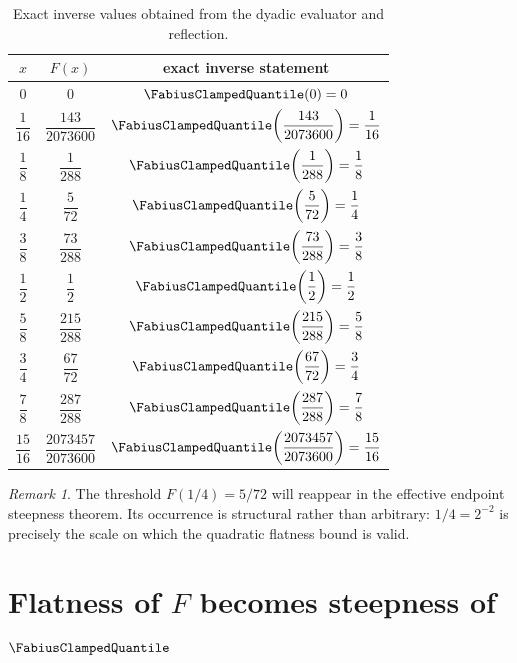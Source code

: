 \documentclass[11pt,oneside]{article}
\theoremstyle{definition}
\theoremstyle{remark}
\newtheorem{remark}[remark]{Remark}
\begin{document}
\begin{table}[ht]
\centering
\small
\begin{tabular}{@{}ccc@{}}
\toprule
$x$ & $F(x)$ & exact inverse statement\\
\midrule
$0$ & $0$ & $\FabiusClampedQuantile(0)=0$\\
$\dfrac1{16}$ & $\dfrac{143}{2073600}$
  & $\FabiusClampedQuantile\!\left(\dfrac{143}{2073600}\right)=\dfrac1{16}$\\[0.55em]
$\dfrac18$ & $\dfrac1{288}$
  & $\FabiusClampedQuantile\!\left(\dfrac1{288}\right)=\dfrac18$\\[0.55em]
$\dfrac14$ & $\dfrac5{72}$
  & $\FabiusClampedQuantile\!\left(\dfrac5{72}\right)=\dfrac14$\\[0.55em]
$\dfrac38$ & $\dfrac{73}{288}$
  & $\FabiusClampedQuantile\!\left(\dfrac{73}{288}\right)=\dfrac38$\\[0.55em]
$\dfrac12$ & $\dfrac12$
  & $\FabiusClampedQuantile\!\left(\dfrac12\right)=\dfrac12$\\[0.55em]
$\dfrac58$ & $\dfrac{215}{288}$
  & $\FabiusClampedQuantile\!\left(\dfrac{215}{288}\right)=\dfrac58$\\[0.55em]
$\dfrac34$ & $\dfrac{67}{72}$
  & $\FabiusClampedQuantile\!\left(\dfrac{67}{72}\right)=\dfrac34$\\[0.55em]
$\dfrac78$ & $\dfrac{287}{288}$
  & $\FabiusClampedQuantile\!\left(\dfrac{287}{288}\right)=\dfrac78$\\[0.55em]
$\dfrac{15}{16}$ & $\dfrac{2073457}{2073600}$
  & $\FabiusClampedQuantile\!\left(\dfrac{2073457}{2073600}\right)=\dfrac{15}{16}$\\
\bottomrule
\end{tabular}
\caption{Exact inverse values obtained from the dyadic evaluator and
reflection.}
\label{inverse:tab:inverse-dyadic}
\end{table}

\begin{remark}
The threshold $F(1/4)=5/72$ will reappear in the effective endpoint
steepness theorem.  Its occurrence is structural rather than arbitrary:
$1/4=2^{-2}$ is precisely the scale on which the quadratic flatness bound
is valid.
\end{remark}

\section{\texorpdfstring{Flatness of \(F\) becomes steepness of \(\FabiusClampedQuantile\)}{Flatness of F becomes steepness of its inverse}}
\label{inverse:sec:inverse-steepness}
\end{document}
